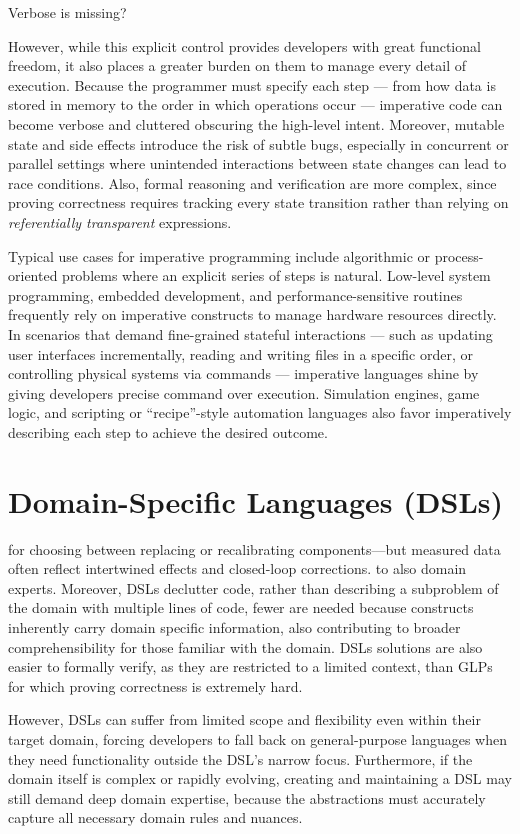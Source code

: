 \documentclass[11pt]{report}
\begin{document}
Verbose is missing?

However, while this explicit control provides developers with great functional freedom, it also places a greater burden on them to manage every detail of execution.
Because the programmer must specify each step — from how data is stored in memory to the order in which operations occur — imperative code can become verbose and cluttered obscuring the high-level intent.
Moreover, mutable state and side effects introduce the risk of subtle bugs, especially in concurrent or parallel settings where unintended interactions between state changes
can lead to race conditions. Also, formal reasoning and verification are more complex, since proving correctness requires tracking every state 
transition rather than relying on \textit{referentially transparent} expressions.

Typical use cases for imperative programming include algorithmic or process-oriented problems where an explicit series of steps is natural.
Low-level system programming, embedded development, and performance-sensitive routines frequently rely on imperative constructs to manage hardware resources directly.
In scenarios that demand fine-grained stateful interactions — such as updating user interfaces incrementally, reading and writing files in a specific order, or
controlling physical systems via commands — imperative languages shine by giving developers precise command over execution.
Simulation engines, game logic, and scripting or “recipe”-style automation languages also favor imperatively describing each step to achieve the desired outcome.

\section{Domain-Specific Languages (DSLs)}

for choosing between replacing or recalibrating components—but measured data often reflect intertwined effects and closed-loop corrections.  to also domain experts. Moreover, DSLs declutter code, rather than describing a subproblem of the domain
with multiple lines of code, fewer are needed because constructs inherently carry domain specific information, also contributing to broader comprehensibility for those familiar with the domain.
DSLs solutions are also easier to formally verify, as they are restricted to a limited context, than GLPs for which proving correctness is extremely hard.

However, DSLs can suffer from limited scope and flexibility even within their target domain, forcing developers to fall back on general-purpose languages when they need functionality outside the 
DSL's narrow focus. Furthermore, if the domain itself is complex or rapidly evolving, creating and maintaining a DSL may still demand deep domain expertise, because the abstractions must 
accurately capture all necessary domain rules and nuances.
\end{document}
